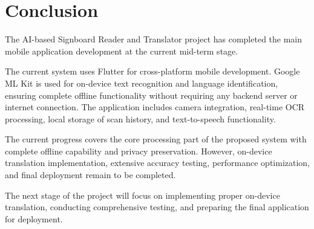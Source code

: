\documentclass[12pt,a4paper]{report}
\begin{document}

\chapter*{Conclusion}

The AI-based Signboard Reader and Translator project has completed the main mobile application development at the current mid-term stage.

The current system uses Flutter for cross-platform mobile development. Google ML Kit is used for on-device text recognition and language identification, ensuring complete offline functionality without requiring any backend server or internet connection. The application includes camera integration, real-time OCR processing, local storage of scan history, and text-to-speech functionality.

The current progress covers the core processing part of the proposed system with complete offline capability and privacy preservation. However, on-device translation implementation, extensive accuracy testing, performance optimization, and final deployment remain to be completed.

The next stage of the project will focus on implementing proper on-device translation, conducting comprehensive testing, and preparing the final application for deployment.

\end{document}
